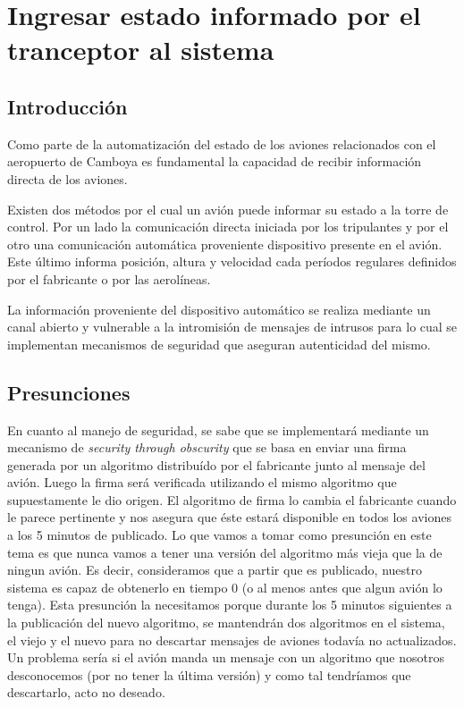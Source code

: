 \section{Ingresar estado informado por el tranceptor al sistema}
\subsection{Introducción}
Como parte de la automatización del estado de los aviones relacionados con el aeropuerto de Camboya es fundamental la capacidad de recibir información directa de los aviones.

Existen dos métodos por el cual un avión puede informar su estado a la torre de control. Por un lado la comunicación directa iniciada por los tripulantes y por el otro una comunicación automática proveniente dispositivo presente en el avión. Este último informa posición, altura y velocidad cada períodos regulares definidos por el fabricante o por las aerolíneas.

La información proveniente del dispositivo automático se realiza mediante un canal abierto y vulnerable a la intromisión de mensajes de intrusos para lo cual se implementan mecanismos de seguridad que aseguran autenticidad del mismo.

\subsection{Presunciones}
En cuanto al manejo de seguridad, se sabe que se implementará mediante un mecanismo de \emph{security through obscurity} que se basa en enviar una firma generada por un algoritmo distribuído por el fabricante junto al mensaje del avión. Luego la firma será verificada utilizando el mismo algoritmo que supuestamente le dio origen. El algoritmo de firma lo cambia el fabricante cuando le parece pertinente y nos asegura que éste estará disponible en todos los aviones a los 5 minutos de publicado. Lo que vamos a tomar como presunción en este tema es que nunca vamos a tener una versión del algoritmo más vieja que la de ningun avión. Es decir, consideramos que a partir que es publicado, nuestro sistema es capaz de obtenerlo en tiempo 0 (o al menos antes que algun avión lo tenga). Esta presunción la necesitamos porque durante los 5 minutos siguientes a la publicación del nuevo algoritmo, se mantendrán dos algoritmos en el sistema, el viejo y el nuevo para no descartar mensajes de aviones todavía no actualizados. Un problema sería si el avión manda un mensaje con un algoritmo que nosotros desconocemos (por no tener la última versión) y como tal tendríamos que descartarlo, acto no deseado.

